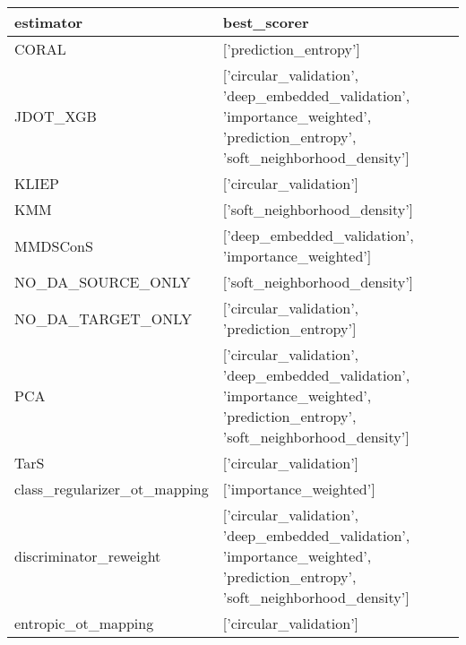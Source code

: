 \begin{tabular}{ll}
\hline
 estimator                    & best\_scorer                                                                                                                   \\
\hline
 CORAL                        & ['prediction\_entropy']                                                                                                        \\
 JDOT\_XGB                     & ['circular\_validation', 'deep\_embedded\_validation', 'importance\_weighted', 'prediction\_entropy', 'soft\_neighborhood\_density'] \\
 KLIEP                        & ['circular\_validation']                                                                                                       \\
 KMM                          & ['soft\_neighborhood\_density']                                                                                                 \\
 MMDSConS                     & ['deep\_embedded\_validation', 'importance\_weighted']                                                                           \\
 NO\_DA\_SOURCE\_ONLY            & ['soft\_neighborhood\_density']                                                                                                 \\
 NO\_DA\_TARGET\_ONLY            & ['circular\_validation', 'prediction\_entropy']                                                                                 \\
 PCA                          & ['circular\_validation', 'deep\_embedded\_validation', 'importance\_weighted', 'prediction\_entropy', 'soft\_neighborhood\_density'] \\
 TarS                         & ['circular\_validation']                                                                                                       \\
 class\_regularizer\_ot\_mapping & ['importance\_weighted']                                                                                                       \\
 discriminator\_reweight       & ['circular\_validation', 'deep\_embedded\_validation', 'importance\_weighted', 'prediction\_entropy', 'soft\_neighborhood\_density'] \\
 entropic\_ot\_mapping          & ['circular\_validation']                                                                                                       \\

\end{tabular}
